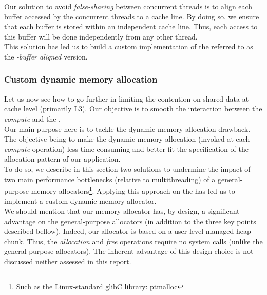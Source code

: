 			Our solution to avoid \emph{false-sharing} between concurrent threads is to align each buffer accessed by the concurrent threads to a cache line.   By doing so, we ensure that each buffer is stored within an independent cache line.   Thus, each access to this buffer will be done independently from any other thread.\\

			This solution has led us to build a custom implementation of the \toolTargetSoftware\space referred to as the \emph{\notationaio-buffer aligned} version.


		\subsubsection{Custom dynamic memory allocation}\label{subsubsection:customDynamicMemoryAllocation_concept}
			Let us now see how to go further in limiting the contention on shared data at cache level (primarily L3).   Our objective is to smooth the interaction between the \emph{compute} and the \notationaioWriteThreads.\\
			Our main purpose here is to tackle the dynamic-memory-allocation drawback.   The objective being to make the dynamic memory allocation (invoked at each \emph{compute} operation) less time-consuming and better fit the specification of the allocation-pattern of our application.\\
			To do so, we describe in this section two solutions to undermine the impact of two main performance bottlenecks (relative to multithreading) of a general-purpose memory allocators\footnote{Such as the Linux-standard glibC library: ptmalloc\cite{robertson2003run}}.   Applying this approach on the \toolTargetSoftware\space has led us to implement a custom dynamic memory allocator.\\

			We should mention that our memory allocator has, by design, a significant advantage on the general-purpose allocators (in addition to the three key points described bellow).   Indeed, our allocator is based on a user-level-managed heap chunk.   Thus, the \emph{allocation} and \emph{free} operations require no system calls (unlike the general-purpose allocators).   The inherent advantage of this design choice is not discussed neither assessed in this report.\\

